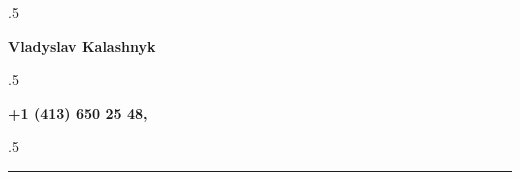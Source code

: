 

\moveleft.5\hoffset\centerline{\Large\bf Vladyslav Kalashnyk} %
 
\moveleft.5\hoffset\centerline{\bf +1 (413) 650 25 48, \hspace{2pt} \email} 
\moveleft.5\hoffset\centerline{\bf {\LinkedIn}}

\vspace*{-6pt}\par\noindent\rule{\textwidth}{0.8pt}\vspace*{-5pt}

